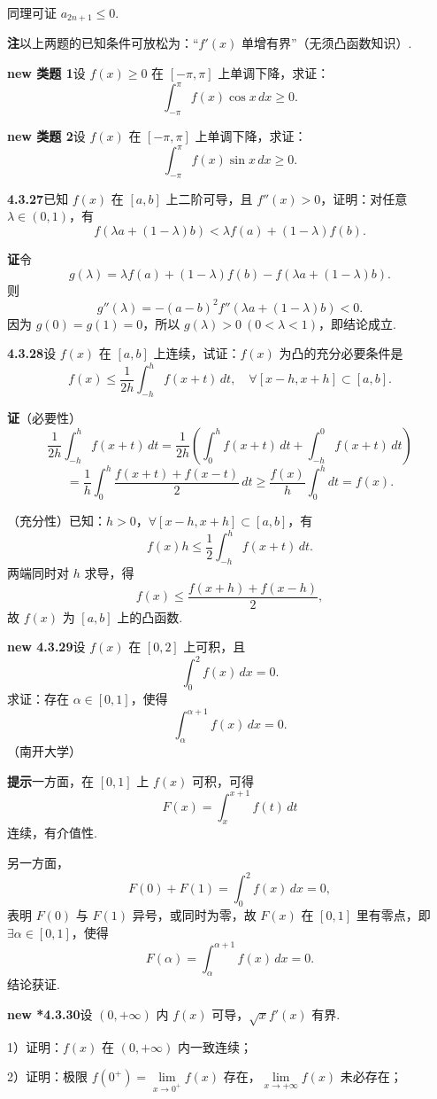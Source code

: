 \documentclass[UTF8, 12pt, fontset=fandol, oneside]{ctexart}
\begin{document}
同理可证 $a_{2n+1}\le0$.

\noindent\textbf{注}\quad 以上两题的已知条件可放松为：“$f'(x)$ 单增有界”（无须凸函数知识）.

\noindent\textbf{new 类题 1}\quad 设 $f(x)\ge0$ 在 $[-\pi,\pi]$ 上单调下降，求证：
\[
\int_{-\pi}^{\pi}f(x)\cos x\,dx\ge0.
\]

\noindent\textbf{new 类题 2}\quad 设 $f(x)$ 在 $[-\pi,\pi]$ 上单调下降，求证：
\[
\int_{-\pi}^{\pi}f(x)\sin x\,dx\ge0.
\]

\noindent\textbf{4.3.27}\quad 已知 $f(x)$ 在 $[a,b]$ 上二阶可导，且 $f''(x)>0$，证明：对任意
$\lambda\in(0,1)$，有
\[
f(\lambda a+(1-\lambda)b)<\lambda f(a)+(1-\lambda)f(b).
\]

\noindent\textbf{证}\quad 令
\[
g(\lambda)=\lambda f(a)+(1-\lambda)f(b)-f(\lambda a+(1-\lambda)b).
\]
则
\[
g''(\lambda)=-(a-b)^2f''(\lambda a+(1-\lambda)b)<0.
\]
因为 $g(0)=g(1)=0$，所以 $g(\lambda)>0\ (0<\lambda<1)$，即结论成立.

\noindent\textbf{4.3.28}\quad 设 $f(x)$ 在 $[a,b]$ 上连续，试证：$f(x)$ 为凸的充分必要条件是
\[
f(x)\le\frac1{2h}\int_{-h}^h f(x+t)\,dt,\quad
\forall [x-h,x+h]\subset[a,b].
\]

\noindent\textbf{证}\quad（必要性）
\[
\frac1{2h}\int_{-h}^hf(x+t)\,dt
=\frac1{2h}\left(\int_0^hf(x+t)\,dt+\int_{-h}^0f(x+t)\,dt\right)
\]
\[
=\frac1h\int_0^h\frac{f(x+t)+f(x-t)}2\,dt
\ge\frac{f(x)}h\int_0^hdt=f(x).
\]

（充分性）已知：$h>0$，$\forall [x-h,x+h]\subset[a,b]$，有
\[
f(x)h\le\frac12\int_{-h}^hf(x+t)\,dt.
\]
两端同时对 $h$ 求导，得
\[
f(x)\le\frac{f(x+h)+f(x-h)}2,
\]
故 $f(x)$ 为 $[a,b]$ 上的凸函数.

\noindent\textbf{new 4.3.29}\quad 设 $f(x)$ 在 $[0,2]$ 上可积，且
\[
\int_0^2f(x)\,dx=0.
\]
求证：存在 $\alpha\in[0,1]$，使得
\[
\int_\alpha^{\alpha+1}f(x)\,dx=0.
\]
（南开大学）

\noindent\textbf{提示}\quad 一方面，在 $[0,1]$ 上 $f(x)$ 可积，可得
\[
F(x)=\int_x^{x+1}f(t)\,dt
\]
连续，有介值性.

另一方面，
\[
F(0)+F(1)=\int_0^2f(x)\,dx=0,
\]
表明 $F(0)$ 与 $F(1)$ 异号，或同时为零，故 $F(x)$ 在 $[0,1]$ 里有零点，即
$\exists\alpha\in[0,1]$，使得
\[
F(\alpha)=\int_\alpha^{\alpha+1}f(x)\,dx=0.
\]
结论获证.

\noindent\textbf{new *4.3.30}\quad 设 $(0,+\infty)$ 内 $f(x)$ 可导，$\sqrt{x}f'(x)$ 有界.

1）证明：$f(x)$ 在 $(0,+\infty)$ 内一致连续；

2）证明：极限 $f(0^+)=\lim\limits_{x\to0^+}f(x)$ 存在，$\lim\limits_{x\to+\infty}f(x)$ 未必存在；
\end{document}
